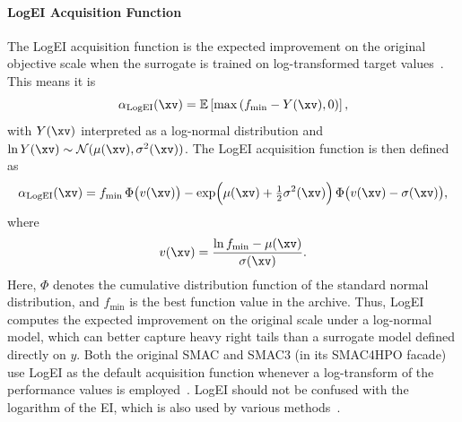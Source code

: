 \paragraph{LogEI Acquisition Function}

The LogEI acquisition function is the expected improvement on the original objective scale when the surrogate is trained on log-transformed target values~\cite{hutter2009}. This means it is
\begin{displaymath}
\alpha_{\mathrm{LogEI}}(\xv) = \mathbb{E} \left[ \max \left( f_{\min} - Y(\xv), 0 \right) \right],
\end{displaymath}
with $Y(\xv)$ interpreted as a log-normal distribution and $\ln Y(\xv) \sim \mathcal{N}(\mu(\xv), \sigma^{2}(\xv))$.
The LogEI acquisition function is then defined as
\begin{equation}
  \alpha_{\mathrm{LogEI}}(\xv)
  = f_{\min}\,\Phi\big(v(\xv)\big)
    - \exp\!\Big(\mu(\xv) + \tfrac{1}{2}\sigma^{2}(\xv)\Big)\,
      \Phi\big(v(\xv) - \sigma(\xv)\big),
\end{equation}
where
\begin{equation}
  v(\xv) = \frac{\ln f_{\min} - \mu(\xv)}{\sigma(\xv)}.
\end{equation}
Here, $\Phi$ denotes the cumulative distribution function of the standard normal distribution, and $f_{\min}$ is the best function value in the archive.
Thus, LogEI computes the expected improvement on the original scale under a log-normal model, which can better capture heavy right tails than a surrogate model defined directly on $y$.
Both the original SMAC and SMAC3 (in its SMAC4HPO facade) use LogEI as the default acquisition function whenever a log-transform of the performance values is employed~\cite{hutter2011,lindauer2022}. LogEI should not be confused with the logarithm of the EI, which is also used by various methods~\cite{watanabe2024}.


